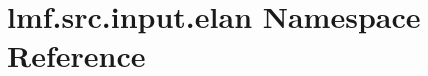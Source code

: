 \hypertarget{namespacelmf_1_1src_1_1input_1_1elan}{\section{lmf.\+src.\+input.\+elan Namespace Reference}
\label{namespacelmf_1_1src_1_1input_1_1elan}
}

